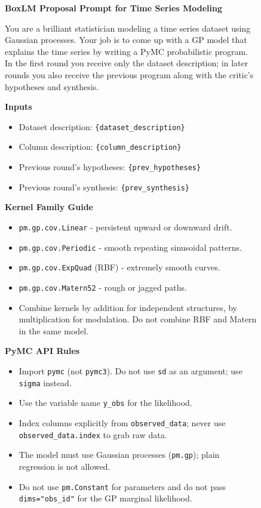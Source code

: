\documentclass{article}
\begin{document}
\begin{figure}[h]
\small
\begin{mdframed}[linecolor=gray!50, backgroundcolor=gray!5, linewidth=0.8pt]

\textbf{BoxLM Proposal Prompt for Time Series Modeling}

\medskip
You are a brilliant statistician modeling a time series dataset using
Gaussian processes. Your job is to come up with a GP model that explains
the time series by writing a PyMC probabilistic program. In the first
round you receive only the dataset description; in later rounds you also
receive the previous program along with the critic's hypotheses and
synthesis.

\medskip
\textbf{Inputs}
\begin{itemize}[leftmargin=*, nosep]
    \item Dataset description: \texttt{\{dataset\_description\}}
    \item Column description: \texttt{\{column\_description\}}
    \item Previous round's hypotheses: \texttt{\{prev\_hypotheses\}}
    \item Previous round's synthesis: \texttt{\{prev\_synthesis\}}
\end{itemize}

\medskip
\textbf{Kernel Family Guide}
\begin{itemize}[leftmargin=*, nosep]
    \item \texttt{pm.gp.cov.Linear} - persistent upward or downward drift.
    \item \texttt{pm.gp.cov.Periodic} - smooth repeating sinusoidal
          patterns.
    \item \texttt{pm.gp.cov.ExpQuad} (RBF) - extremely smooth curves.
    \item \texttt{pm.gp.cov.Matern52} - rough or jagged paths.
    \item Combine kernels by addition for independent structures, by
          multiplication for modulation. Do not combine RBF and Matern in
          the same model.
\end{itemize}

\medskip
\textbf{PyMC API Rules}
\begin{itemize}[leftmargin=*, nosep]
    \item Import \texttt{pymc} (not \texttt{pymc3}). Do not use \texttt{sd}
          as an argument; use \texttt{sigma} instead.
    \item Use the variable name \texttt{y\_obs} for the likelihood.
    \item Index columns explicitly from \texttt{observed\_data}; never use
          \texttt{observed\_data.index} to grab raw data.
    \item The model must use Gaussian processes (\texttt{pm.gp}); plain
          regression is not allowed.
    \item Do not use \texttt{pm.Constant} for parameters and do not pass
          \texttt{dims="obs\_id"} for the GP marginal likelihood.
\end{itemize}


\end{mdframed}
\end{figure}
\end{document}
